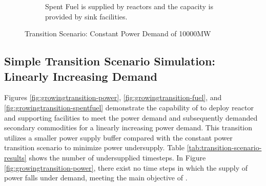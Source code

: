 \begin{figure}[]
\begin{subfigure}[t]{0.6\textwidth}
            \caption{Spent Fuel is supplied by reactors and the capacity is provided 
            by sink facilities.}
            \label{fig:constanttransition-spentfuel}
        \end{subfigure}
        \caption{Transition Scenario: Constant Power Demand of 10000MW}
    \end{figure}

    \subsection{Simple Transition Scenario Simulation: Linearly Increasing Demand}

    Figures \ref{fig:growingtransition-power}, \ref{fig:growingtransition-fuel},
    and \ref{fig:growingtransition-spentfuel} demonstrate the capability 
    of \deploy to deploy reactor and supporting facilities to meet the
    power demand and subsequently demanded secondary commodities 
    for a linearly increasing power demand. 
    This transition utilizes a smaller power supply buffer compared with the constant 
    power transition scenario to minimize power undersupply.
    Table \ref{tab:transition-scenario-results} shows the number of 
    undersupplied timesteps. 
    In Figure \ref{fig:growingtransition-power}, there exist no time steps 
    in which the supply of power falls under demand, meeting the main 
    objective of \deploy. 
    
